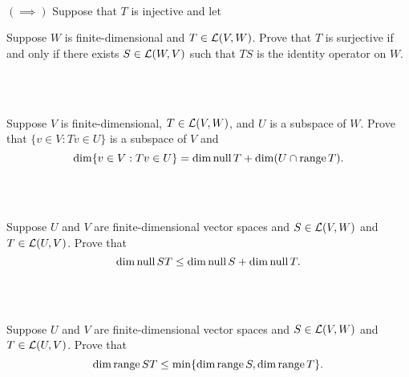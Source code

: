 \begin{solution}
    \\ $(\implies)$ Suppose that $T$ is injective and let \td \\
\end{solution}

\begin{exercise}
    Suppose $W$ is finite-dimensional and $T \in \mathcal{L}(V,W)$. Prove that $T$ is surjective if and only if there exists $S \in \mathcal{L}(W,V)$ such that $TS$ is the identity operator on $W$. \\
\end{exercise}

\begin{solution}
    \\ \td \\
\end{solution}

\begin{exercise}
    Suppose $V$ is finite-dimensional, $T \in \mathcal{L}(V,W)$, and $U$ is a subspace of $W$. Prove that $\{v \in V : Tv \in U\}$ is a subspace of $V$ and
    $$\dim \{v \in V : Tv \in U\} = \dim \operatorname{\text{null}} T + \dim (U \cap \operatorname{\text{range}} T).$$
\end{exercise}

\begin{solution}
    \\ \td \\
\end{solution}

\begin{exercise}
    Suppose $U$ and $V$ are finite-dimensional vector spaces and $S \in \mathcal{L}(V,W)$ and $T \in \mathcal{L}(U,V)$. Prove that
    $$\dim \operatorname{\text{null}} ST \leq \dim \operatorname{\text{null}} S + \dim \operatorname{\text{null}} T.$$
\end{exercise}

\begin{solution}
    \\ \td \\
\end{solution}

\begin{exercise}
    Suppose $U$ and $V$ are finite-dimensional vector spaces and $S \in \mathcal{L}(V,W)$ and $T \in \mathcal{L}(U,V)$. Prove that
    $$\dim \operatorname{\text{range}} ST \leq \min\{\dim \operatorname{\text{range}} S, \dim \operatorname{\text{range}} T\}.$$
\end{exercise}

\begin{solution}
    \\ \td \\
\end{solution}

